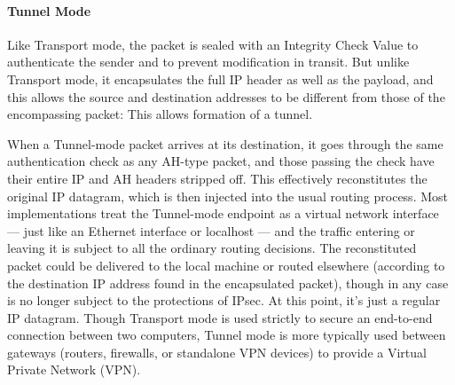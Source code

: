 \documentclass[12pt]{article}
\begin{document}
\paragraph{Tunnel Mode}
Like Transport mode, the packet is sealed with an Integrity Check Value to authenticate the sender and to prevent modification in transit. But unlike Transport mode, it encapsulates the full IP header as well as the payload, and this allows the source and destination addresses to be different from those of the encompassing packet: This allows formation of a tunnel.

When a Tunnel-mode packet arrives at its destination, it goes through the same authentication check as any AH-type packet, and those passing the check have their entire IP and AH headers stripped off. This effectively reconstitutes the original IP datagram, which is then injected into the usual routing process.
Most implementations treat the Tunnel-mode endpoint as a virtual network interface — just like an Ethernet interface or localhost — and the traffic entering or leaving it is subject to all the ordinary routing decisions.
The reconstituted packet could be delivered to the local machine or routed elsewhere (according to the destination IP address found in the encapsulated packet), though in any case is no longer subject to the protections of IPsec. At this point, it's just a regular IP datagram.
Though Transport mode is used strictly to secure an end-to-end connection between two computers, Tunnel mode is more typically used between gateways (routers, firewalls, or standalone VPN devices) to provide a Virtual Private Network (VPN).
 
\end{document}
